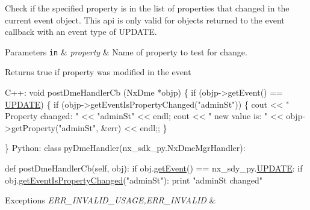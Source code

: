 Check if the specified property is in the list of properties that changed in the current event object. This api is only valid for objects returned to the event callback with an event type of U\+P\+D\+A\+TE.


\begin{DoxyParams}[1]{Parameters}
\mbox{\tt in}  & {\em property} & Name of property to test for change. \\
\hline
\end{DoxyParams}
\begin{DoxyReturn}{Returns}
true if property was modified in the event 
\begin{DoxyCode}
C++:
    \textcolor{keywordtype}{void} postDmeHandlerCb (NxDme *objp)
    \{
       \textcolor{keywordflow}{if} (objp->getEvent() == \mbox{\hyperlink{namespacenxos_af9a9040b7681199d386e94eb888018cba4f3a5ababd9a5356d642a492f5ccc371}{UPDATE}}) \{
         \textcolor{keywordflow}{if} (objp->getEventIsPropertyChanged(\textcolor{stringliteral}{"adminSt"})) \{
            cout << \textcolor{stringliteral}{" Property changed: "} << \textcolor{stringliteral}{"adminSt"} << endl;
            cout << \textcolor{stringliteral}{" new value is: "} <<
              objp->getProperty(\textcolor{stringliteral}{"adminSt"}, &err) << endl;;
        \}

     \}
Python:
    \textcolor{keyword}{class }pyDmeHandler(nx\_sdk\_py.NxDmeMgrHandler):

        def postDmeHandlerCb(self, obj):
           if obj.\mbox{\hyperlink{classnxos_1_1_nx_dme_aff302a3891e0b6f69e9e0fd26e6e16a7}{getEvent}}() == nx\_sdy\_py.\mbox{\hyperlink{namespacenxos_af9a9040b7681199d386e94eb888018cba4f3a5ababd9a5356d642a492f5ccc371}{UPDATE}}:
               if obj.\mbox{\hyperlink{classnxos_1_1_nx_dme_a6f7052ff8ef29df2f692dbfdb3a8c987}{getEventIsPropertyChanged}}("adminSt"):
                   print "adminSt changed"
\end{DoxyCode}

\end{DoxyReturn}

\begin{DoxyExceptions}{Exceptions}
{\em E\+R\+R\+\_\+\+I\+N\+V\+A\+L\+I\+D\+\_\+\+U\+S\+A\+GE,E\+R\+R\+\_\+\+I\+N\+V\+A\+L\+ID} & \\
\hline
\end{DoxyExceptions}
\mbox{\label{classnxos_1_1_nx_dme_af4a2a0bb41b6be55593e8624700a2d6d}} 
